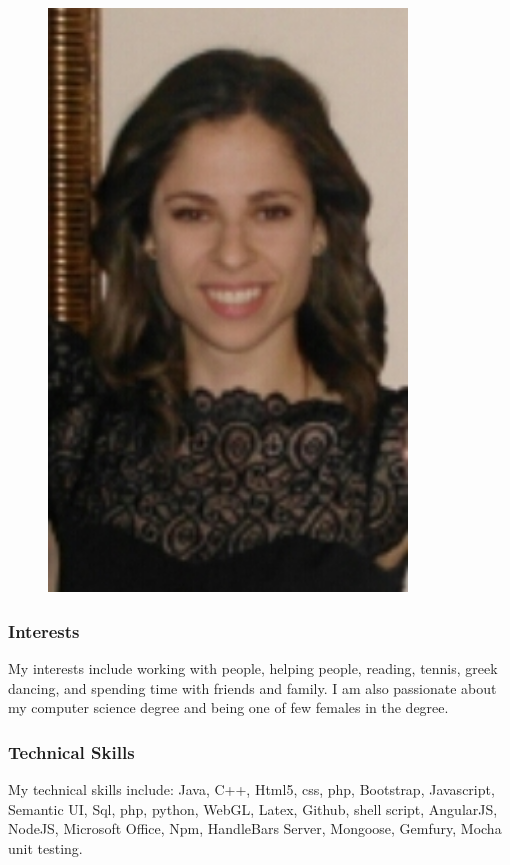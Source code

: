 \documentclass[hidelinks, 12pt, oneside]{article}
\begin{document}
\begin{figure}[h!]
  \centering
    \includegraphics[width=0.85\textwidth]{t} 
\end{figure}

\subsubsection{Interests}
My interests include working with people, helping people, reading, tennis, greek dancing, and spending time with friends and family. I am also passionate about my computer science degree and being one of few females in the degree. 
\subsubsection{Technical Skills}
My technical skills include: Java, C++, Html5, css, php, Bootstrap, Javascript, Semantic UI, Sql, php, python,  WebGL, Latex, Github, shell script, AngularJS, NodeJS, Microsoft Office, Npm, HandleBars Server, Mongoose, Gemfury, Mocha unit testing. 
\end{document}
